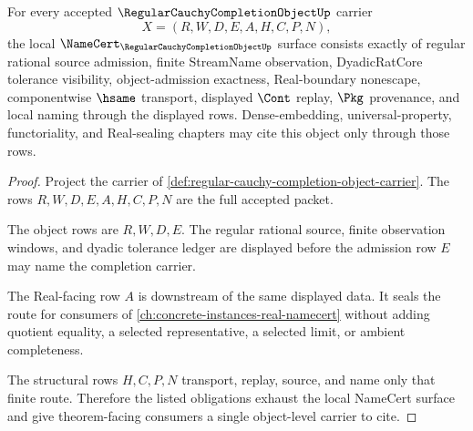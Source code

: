 \begin{theorem}
\label{thm:regular-cauchy-completion-object-namecert-obligations}
For every accepted $\RegularCauchyCompletionObjectUp$ carrier
$$
X=(R,W,D,E,A,H,C,P,N),
$$
the local $\NameCert_{\RegularCauchyCompletionObjectUp}$ surface consists exactly of regular rational source admission, finite StreamName observation, DyadicRatCore tolerance visibility, object-admission exactness, Real-boundary nonescape, componentwise $\hsame$ transport, displayed $\Cont$ replay, $\Pkg$ provenance, and local naming through the displayed rows. Dense-embedding, universal-property, functoriality, and Real-sealing chapters may cite this object only through those rows.
\end{theorem}
\begin{proof}
Project the carrier of \autoref{def:regular-cauchy-completion-object-carrier}. The rows $R,W,D,E,A,H,C,P,N$ are the full accepted packet.

The object rows are $R,W,D,E$. The regular rational source, finite observation windows, and dyadic tolerance ledger are displayed before the admission row $E$ may name the completion carrier.

The Real-facing row $A$ is downstream of the same displayed data. It seals the route for consumers of \autoref{ch:concrete-instances-real-namecert} without adding quotient equality, a selected representative, a selected limit, or ambient completeness.

The structural rows $H,C,P,N$ transport, replay, source, and name only that finite route. Therefore the listed obligations exhaust the local NameCert surface and give theorem-facing consumers a single object-level carrier to cite.
\end{proof}

